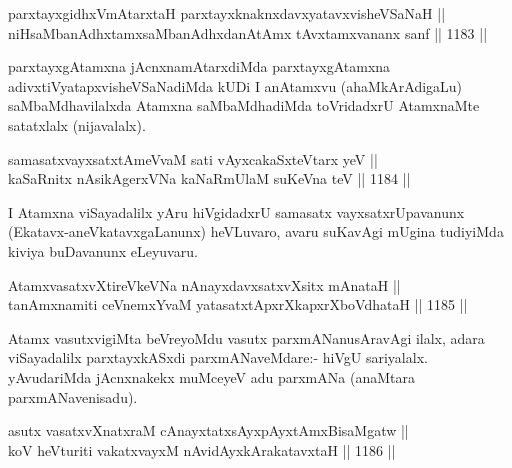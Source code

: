 \begin{shl}
parxtayxgidhxVmAtarxtaH parxtayxknaknxdavxyatavxvisheVSaNaH || \\
niHsaMbanAdhxtamxsaMbanAdhxdanAtAmx tAvxtamxvananx sanf \hfill || 1183 ||  
\end{shl}

\begin{artha}
parxtayxgAtamxna jAcnxnamAtarxdiMda parxtayxgAtamxna adivxtiVyatapxvisheVSaNadiMda kUDi I anAtamxvu (ahaMkArAdigaLu) saMbaMdhavilalxda Atamxna saMbaMdhadiMda toVridadxrU AtamxnaMte satatxlalx (nijavalalx).
\end{artha}


\begin{shl}
samasatxvayxsatxtAmeVvaM sati vAyxcakaSxteV\s tarx yeV || \\
kaSaRnitx nAsikAgerxVNa kaNaRmUlaM suKeVna teV \hfill || 1184 ||  
\end{shl}

\begin{artha}
I Atamxna viSayadalilx yAru hiVgidadxrU samasatx vayxsatxrUpavanunx (Ekatavx-aneVkatavxgaLanunx) heVLuvaro, avaru suKavAgi mUgina tudiyiMda kiviya buDavanunx eLeyuvaru.
\end{artha}

\begin{shl}
AtamxvasatxvXtireVkeVNa nAnayxdavxsatxvXsitx mAnataH || \\
tanAmxnamiti ceVnemxYvaM yatasatxtApxrXkapxrXboVdhataH \hfill || 1185 ||  
\end{shl}

\begin{artha}
Atamx vasutxvigiMta beVreyoMdu vasutx parxmANanusAravAgi ilalx, adara viSayadalilx parxtayxkASxdi parxmANaveMdare:- hiVgU sariyalalx. yAvudariMda jAcnxnakekx muMceyeV adu parxmANa (anaMtara parxmANavenisadu).
\end{artha}

\begin{shl}
\footnotemark[1]asutx vasatxvXnatxraM cAnayxtatxsAyxpAyxtAmxBisaMgatw || \\
koV heVturiti vakatxvayxM nAvidAyx\s kArakatavxtaH \hfill || 1186 ||  
\end{shl}

